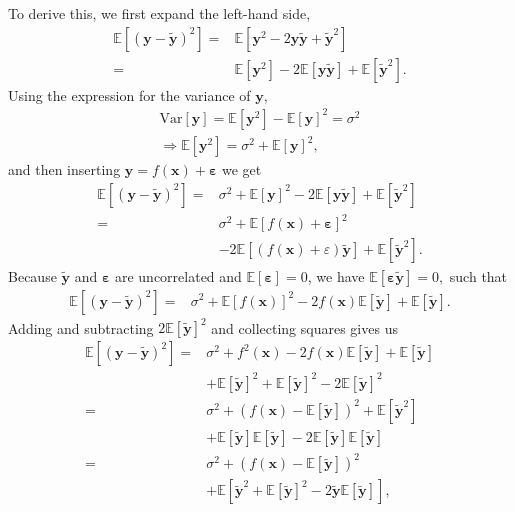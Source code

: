 \documentclass[a4paper, 10pt]{article}
\begin{document}
\begin{multicols}{2}
To derive this, we first expand the left-hand side,
\begin{align*}
\mathbb{E}[	(\bm{y}-\bm{\tilde{y}})^2] =& \mathbb{E}[\bm{y}^2  -2\bm{y}\bm{\tilde{y}}+ \bm { \tilde{y} } ^2 ] \\
=& \mathbb{E}[\bm{y}^2]  - 2\mathbb{E}[\bm{y\tilde{y}}]+\mathbb{E}[\bm{\tilde{y}}^2].
\end{align*}
Using the expression for the variance of $\bm{y}$,
\begin{align}
\text{Var}[\bm{y}] = \mathbb{E}[\bm{y}^2] - \mathbb{E}[{\bm{y}}]^2 = \sigma^2\\
\Rightarrow \mathbb{E}[\bm{y}^2] = \sigma^2 + \mathbb{E}[{\bm{y}}]^2,
\end{align}
 and then inserting $\bm{y} = f(\bm{x}) + \bm{\varepsilon}$ we get
\begin{align*}
\mathbb{E}[	(\bm{y}-\bm{\tilde{y}})^2]=& \sigma^2 +  \mathbb{E}[\bm{y}]^2  -2 \mathbb{E}[\bm{y}\bm{\tilde{y}}] +  \mathbb{E}[\bm{\tilde{y}}^2]\\
=& \sigma^2 +  \mathbb{E}[f(\bm{x}) + \bm{\varepsilon}]^2 \\&- 2 \mathbb{E} [(f(\bm{x})+\varepsilon)\bm{\tilde{y}}] +  \mathbb{E}[\bm{\tilde{y}}^2 ].
\end{align*}
Because  $\bm{\tilde{y}}$ and $\bm{\varepsilon}$ are uncorrelated and $\mathbb{E}[\bm{\varepsilon}]=0$, we have $\mathbb{E}[\bm{\varepsilon\tilde{y}}]=0,$ such that
\begin{align*}
\mathbb{E}[	(\bm{y}-\bm{\tilde{y}})^2]=& \sigma^2 +  \mathbb{E}[f(\bm{x})]^2 -2f(\bm{x}) \mathbb{E}[\bm{\tilde{y}}] +  \mathbb{E}[\bm{\tilde{y}}].
\end{align*}
Adding and subtracting $2\mathbb{E}[\bm{\tilde{y}}]^2$ and collecting squares gives us
\begin{align*}
\mathbb{E}[	(\bm{y}-\bm{\tilde{y}})^2]=&\sigma^2 + f^2(\bm{x})-2f(\bm{x}) \mathbb{E}[\bm{\tilde{y}}] +  \mathbb{E}[\bm{\tilde{y}}]\\&+\mathbb{E}[\bm{\tilde{y}}]^2 + \mathbb{E}[\bm{\tilde{y}}]^2 -2\mathbb{E}[\bm{\tilde{y}}]^2\\
=&  \sigma ^2  + ( f(\bm{x}) -\mathbb{E}[\bm{\tilde{y}}]  )^2 + \mathbb{E}[\bm{\tilde{y}}^2] \\&+\mathbb{E}[\bm{\tilde{y}}]\mathbb{E}[\bm{\tilde{y}}]  - 2\mathbb{E}[\bm{\tilde{y}}]\mathbb{E}[\bm{\tilde{y}}]\\
= &  \sigma^2 +  ( f(\bm{x}) -\mathbb{E}[\bm{\tilde{y}}]  )^2   \\&+ \mathbb{E}[\bm{\tilde{y}}^2 + \mathbb{E}[\bm{\tilde{y}}]^2 - 2\bm{\tilde{y}}\mathbb{E}[\bm{\tilde{y}}]],

\end{align*}
\end{multicols}
\end{document}
